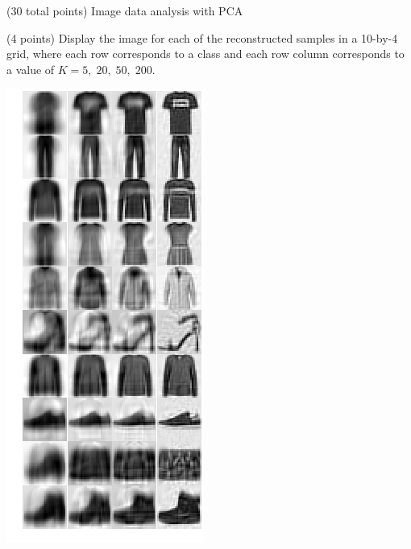 \documentclass[12pt]{article}
\begin{document}
\begin{question}{(30 total points) Image data analysis with PCA}
\begin{subquestion}
   \end{subquestion}
   
   \begin{subquestion}{(4 points)
       Display the image for each of the reconstructed samples in
       a 10-by-4 grid, where each row corresponds to a class and
       each row column corresponds to a value of $K=5, \; 20, \; 50, \; 200$.
     } \label{Q1.7}


   

      \begin{answerbox}{52em}
             \begin{center}
	\includegraphics[width=\textwidth]{imgs/1_7.png}
	\end{center}
      \end{answerbox}
  


   \end{subquestion}
\end{question}
\end{document}
